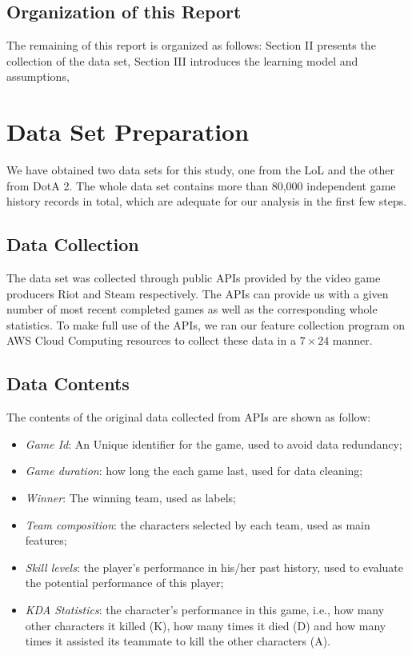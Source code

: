 \documentclass[conference]{IEEEtran}
\begin{document}

\subsection{Organization of this Report}
The remaining of this report is organized as follows: Section II presents the collection of the data set, Section III introduces the learning model and assumptions,

\section{Data Set Preparation}
We have obtained two data sets for this study, one from the LoL and the other from DotA 2. The whole data set contains more than 80,000 independent game history records in total, which are adequate for our analysis in the first few steps.

\subsection{Data Collection}

The data set was collected through public APIs provided by the video game producers Riot and Steam respectively. The APIs can provide us with a given number of most recent completed games as well as the corresponding whole statistics. To make full use of the APIs, we ran our feature collection program on AWS Cloud Computing resources to collect these data in a $7\times24$ manner.


\subsection{Data Contents}

The contents of the original data collected from APIs are shown as follow:


\begin{itemize}
\item \textit{Game Id}: An Unique identifier for the game, used to avoid data redundancy;
\item \textit{Game duration}: how long the each game last, used for data cleaning;
\item \textit{Winner}: The winning team, used as labels;
\item \textit{Team composition}: the characters selected by each team, used as main features;
\item \textit{Skill levels}: the player's performance in his/her past history, used to evaluate the potential performance of this player;
\item \textit{KDA Statistics}: the character's performance in this game, i.e., how many other characters it killed (K), how many times it died (D) and how many times it assisted its teammate to kill the other characters (A).
\end{itemize}
\end{document}
